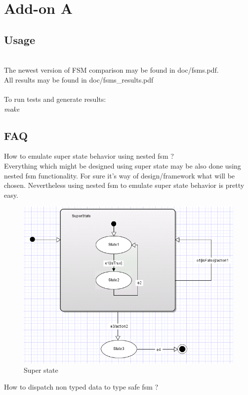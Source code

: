 \chapter{Add-on A}
\label{fsms_repository}
\section{Usage}
\\
The newest version of FSM comparison may be found in doc/fsms.pdf. \\
All results may be found in doc/fsms\_results.pdf
\\
\\
To run tests and generate results:\\
\textit{make}\\

\newpage
\section{FAQ}

How to emulate super state behavior using nested fsm ?\\
Everything which might be designed using super state may be also done using nested fsm functionality.
For sure it's way of design/framework what will be chosen. Nevertheless using nested fsm
to emulate super state behavior is pretty easy.

\begin{figure}[htbp]
    \centering
    \includegraphics[scale=0.8]{images/faq/superstate.png}
    \caption[Super state]{Super state}
\end{figure}



\newpage
How to dispatch non typed data to type safe fsm ?\\



